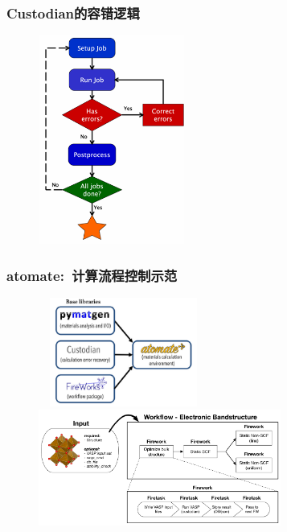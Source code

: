 {{\frame
{
	\frametitle{\textrm{Custodian}的容错逻辑}
\begin{figure}[h!]
\centering
\vspace*{-0.1in}
\includegraphics[height=2.7in]{Figures/MP_custodian.png}
\label{Custodian_over}
\caption{\fontsize{7.2pt}{4.2pt}}%
\end{figure} 
}

\frame
{
	\frametitle{\textrm{atomate}:~计算流程控制示范}
\begin{figure}[h!]
\centering
\vspace*{-0.19in}
\includegraphics[height=1.4in,width=2.2in,viewport=0 0 820 630,clip]{Figures/Atomate_comp.png}
\vskip 1pt
\includegraphics[height=1.5in]{Figures/bandstructure_wf.png}
\label{Logo_QM-MM}
\end{figure} 
}

}}
